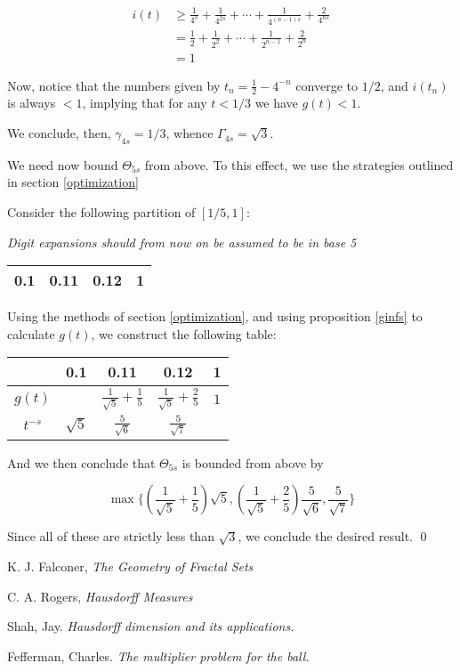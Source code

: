 \documentclass[11pt, reqno]{amsart}
\begin{document}
\begin{align*}
i(t) &\geq \frac 1 {4^s} + \frac 1 {4^{2s}} + \cdots + \frac 1 {4^{(n-1)s}} + \frac 2 {4^{ns}} \\
&= \frac 1 {2} + \frac 1 {2^2} + \cdots + \frac 1 {2^{n-1}} + \frac 2 {2^n} \\
&= 1
\end{align*}

Now, notice that the numbers given by $t_n = \frac 1 2 - 4^{-n}$ converge to $1/2$, and $i(t_n)$ is always $< 1$, implying that for any $t < 1/3$ we have $g(t) < 1$.

We conclude, then, $\gamma_{4s} = 1/3$, whence $\Gamma_{4s} = \sqrt 3$.

We need now bound $\Theta_{5s}$ from above. To this effect, we use the strategies outlined in section \ref{optimization}

Consider the following partition of $\left[1/5, 1 \right]$:

\emph{Digit expansions should from now on be assumed to be in base 5}

\begin{center}
\begin{tabular}{| c | @{\qquad\qquad} | c | @{\qquad\qquad} | c | @{\qquad\qquad} | c |}
\hline
0.1 & 0.11 & 0.12 & 1 \\
\hline
\end{tabular}
\end{center}

Using the methods of section \ref{optimization}, and using proposition \ref{ginfs} to calculate $g(t)$, we construct the following table:

\begin{center}
\tabulinesep=1.2mm
\begin{tabu}{| c | | c | @{\qquad\qquad} | c | @{\qquad\qquad} | c | @{\qquad\qquad} | c |}
\hline
& 0.1 & 0.11 & 0.12 & 1 \\
\hline
$g(t)$ & & $\frac 1 {\sqrt{5}} + \frac 1 5$ & $\frac 1 {\sqrt{5}} + \frac 2 5$ & $1$ \\
$t^{-s}$ & $\sqrt 5$ & $\frac 5 {\sqrt 6}$ & $\frac 5 {\sqrt 7}$ & \\
\hline
\end{tabu}
\end{center}

And we then conclude that $\Theta_{5s}$ is bounded from above by

\[ \max \{ (\frac 1 {\sqrt{5}} + \frac 1 5) \sqrt 5, (\frac 1 {\sqrt{5}} + \frac 2 5) \frac 5 {\sqrt 6}, \frac 5 {\sqrt 7} \}\]

Since all of these are strictly less than $\sqrt 3$, we conclude the desired result. \qed


\begin{thebibliography}{1}
K. J. Falconer, \textit{The Geometry of Fractal Sets}

C. A. Rogers, \textit{Hausdorff Measures}

Shah, Jay. \textit{Hausdorff dimension and its applications.}

Fefferman, Charles. \textit{The multiplier problem for the ball.}

\end{thebibliography}
\end{document}
